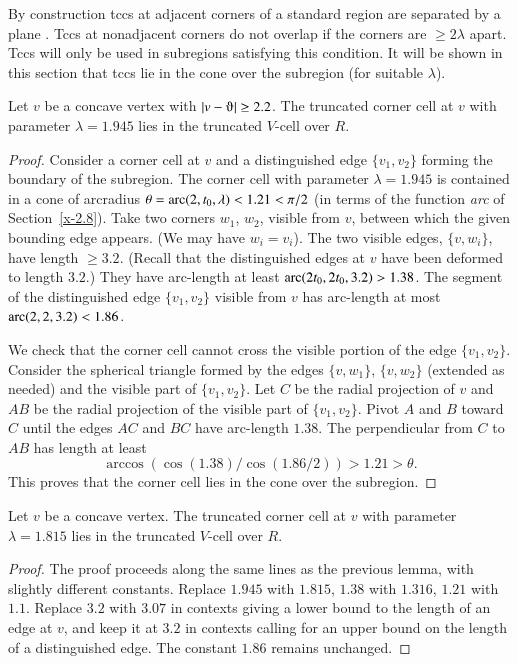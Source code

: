 By construction tccs at adjacent
corners of a standard region are separated by a plane . Tccs at
nonadjacent corners do not overlap if the corners are
$\ge2\lambda$ apart. Tccs will only be used in subregions
satisfying this condition. It will be shown in
this section that tccs lie in the cone over the subregion
(for suitable $\lambda$).

\begin{lemma}
Let $v$ be a concave vertex with $|v-\orgn|\ge2.2$. The truncated
corner cell at $v$ with parameter $\lambda=1.945$ lies in the truncated
$V$-cell over $R$.
\end{lemma}

\begin{proof}
Consider a  corner cell at $v$ and a distinguished edge $\{v_1,v_2\}$
forming the boundary of the subregion. The corner cell with parameter
$\lambda=1.945$ is contained in a cone of arcradius
    $\theta = \operatorname{arc}(2,t_0,\lambda)< 1.21 <\pi/2$
(in terms of the function {\it arc\/} of Section~\ref{x-2.8}). Take two
corners $w_1$, $w_2$, visible from $v$, between which the given bounding
edge appears. (We may have $w_i=v_i$). The two visible edges, $\{v,w_i\}$,
have length $\ge 3.2$. (Recall that the distinguished edges at $v$ have
been deformed to length $3.2$.) They have arc-length at least
$\operatorname{arc}(2t_0,2t_0,3.2)>1.38$. The segment of the distinguished edge
$\{v_1,v_2\}$ visible from $v$ has arc-length at most
$\operatorname{arc}(2,2,3.2)<1.86$.

We check that the corner cell cannot cross the visible portion of
the edge $\{v_1,v_2\}$. Consider the spherical triangle formed by
the edges $\{v,w_1\}$, $\{v,w_2\}$ (extended as needed) and the
visible part of $\{v_1,v_2\}$. Let $C$ be the radial projection of
$v$ and $AB$ be the radial projection of the visible part of
$\{v_1,v_2\}$. Pivot $A$ and $B$ toward $C$ until the edges $AC$ and
$BC$ have arc-length $1.38$.  The perpendicular from $C$ to $AB$
has length at least
    $$\arccos(\cos(1.38)/\cos(1.86/2))>1.21>\theta.$$
This proves that the corner cell lies in the cone over the subregion.
\end{proof}

\begin{lemma}
Let $v$ be a concave vertex. The truncated corner cell at $v$ with
parameter $\lambda=1.815$ lies in the truncated $V$-cell over $R$.
\end{lemma}

\begin{proof}
The proof proceeds along the same lines as the previous lemma, with
slightly different constants. Replace $1.945$ with $1.815$, $1.38$ with
$1.316$, $1.21$ with $1.1$. Replace $3.2$ with $3.07$ in contexts giving
a lower bound to the length of an edge at $v$, and keep it at $3.2$ in
contexts calling for an upper bound on the length of a distinguished
edge. The constant $1.86$ remains unchanged.
\end{proof}

